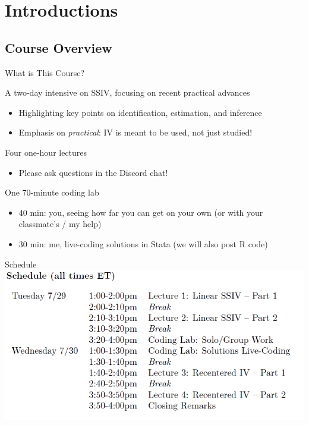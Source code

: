 \documentclass[t]{beamer}
\begin{document}
\setlength{\abovedisplayskip}{5pt}
\setlength{\belowdisplayskip}{5pt}
\setlength{\abovedisplayshortskip}{5pt}
\setlength{\belowdisplayshortskip}{5pt}


\section{Introductions}

\subsection{Course Overview}

\begin{frame}{What is This Course?}

A two-day intensive on SSIV, focusing on recent practical advances

\begin{itemize}
  \item Highlighting key points on identification, estimation, and inference
  \item Emphasis on \emph{practical}: IV is meant to be used, not just studied!
\end{itemize}\pause\medskip

Four one-hour lectures

\begin{itemize}
  \item Please ask questions in the Discord chat!
\end{itemize}\pause\medskip

One 70-minute coding lab
\begin{itemize}
  \item 40 min: you, seeing how far you can get on your own (or with your classmate's / my  help)
  \item 30 min: me, live-coding solutions in Stata (we will also post R code)
\end{itemize}

\end{frame}

\begin{frame}{Schedule}
\vspace*{\fill}
\includegraphics[scale=0.55]{./lecture_includes/schedule.png}
\vspace*{\fill}
\end{frame}
\end{document}
